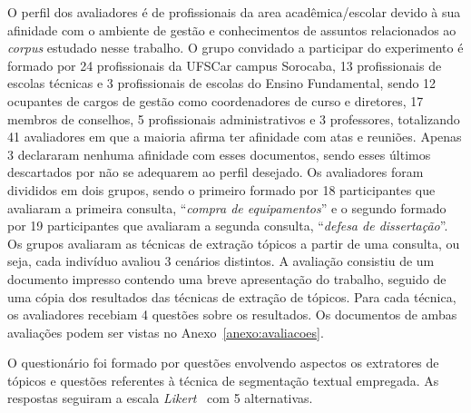 O perfil dos avaliadores é de profissionais da area acadêmica/escolar devido à sua afinidade com o ambiente de gestão e conhecimentos de assuntos relacionados ao \textit{corpus} estudado nesse trabalho. O grupo convidado a participar do experimento é formado por 24 profissionais da UFSCar campus Sorocaba, 13 profissionais de escolas técnicas e 3 profissionais de escolas do Ensino Fundamental, sendo 12 ocupantes de cargos de gestão como coordenadores de curso e diretores, 17 membros de conselhos, 5 profissionais administrativos e 3 professores, totalizando 41 avaliadores em que a maioria afirma ter afinidade com atas e reuniões. Apenas 3 declararam nenhuma afinidade com esses documentos, sendo esses últimos descartados por não se adequarem ao perfil desejado. Os avaliadores foram divididos em dois grupos, sendo o primeiro formado por 18 participantes que avaliaram a primeira consulta, ``\textit{compra de equipamentos}'' e o segundo formado por 19 participantes que avaliaram a segunda consulta, ``\textit{defesa de dissertação}''. Os grupos avaliaram as técnicas de extração tópicos a partir de uma consulta, ou seja, cada indivíduo avaliou 3 cenários distintos. A avaliação consistiu de um documento impresso contendo uma breve apresentação do trabalho, seguido de uma cópia dos resultados das técnicas de extração de tópicos. Para cada técnica, os avaliadores recebiam 4 questões sobre os resultados. Os documentos de ambas avaliações podem ser vistas no Anexo~\ref{anexo:avaliacoes}.


O questionário foi formado por questões envolvendo aspectos os extratores de tópicos e questões referentes à técnica de segmentação textual empregada.
As respostas seguiram a escala \textit{Likert}~\cite{Norman2010} com 5 alternativas. 



